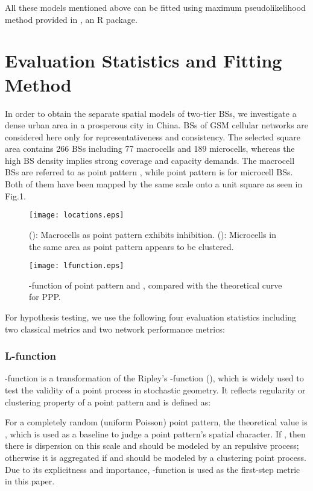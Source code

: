 \documentclass[conference]{IEEEtran}
\begin{document}
All these models mentioned above can be fitted using maximum pseudolikelihood method\cite{baddeley2000practical} provided in , an R package\cite{baddeley2005spatstat}.

\section{Evaluation Statistics and Fitting Method}
In order to obtain the separate spatial models of two-tier BSs, we investigate a dense urban area in a prosperous city in China. BSs of GSM cellular networks are considered here only for representativeness and consistency. The selected   square area contains 266 BSs including 77 macrocells and 189 microcells, whereas the high BS density implies strong coverage and capacity demands. The macrocell BSs are referred to as point pattern , while point pattern  is for microcell BSs. Both of them have been mapped by the same scale onto a unit square as seen in Fig.1.

\begin{figure}[!t]
\centering
\texttt{[image: locations.eps]}
\caption{(): Macrocells as point pattern  exhibits inhibition. (): Microcells in the same area as point pattern  appears to be clustered.}
\end{figure}

\begin{figure}[!t]
\centering
\texttt{[image: lfunction.eps]}
\caption{-function of point pattern  and , compared with the theoretical curve for PPP.}
\end{figure}

For hypothesis testing, we use the following four evaluation statistics including two classical metrics and two network performance metrics:
\setcounter{subsubsection}{0}
\subsubsection{\bf{L-function}}
-function is a transformation of the Ripley's -function (), which is widely used to test the validity of a point process in stochastic geometry\cite{ripley1991statistical}. It reflects regularity or clustering property of a point pattern and is defined as:

For a completely random (uniform Poisson) point pattern, the theoretical value is , which is used as a baseline to judge a point pattern's spatial character\cite{ripley1991statistical}. If , then there is dispersion on this  scale and should be modeled by an repulsive process; otherwise it is aggregated if  and should be modeled by a clustering point process. Due to its explicitness and importance, -function is used as the first-step metric in this paper.
\end{document}
